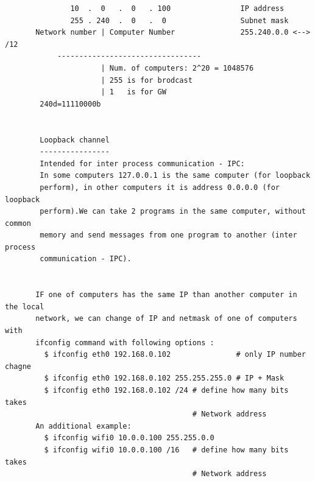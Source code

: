 \documentclass[a4paper,12pt]{article}
\begin{document}
\begin{verbatim}
               10  .  0   .  0   . 100                IP address
               255 . 240  .  0   .  0                 Subnet mask 
       Network number | Computer Number               255.240.0.0 <--> /12
            ---------------------------------        
                      | Num. of computers: 2^20 = 1048576
                      | 255 is for brodcast
                      | 1   is for GW
        240d=11110000b 


        Loopback channel
        ---------------- 
        Intended for inter process communication - IPC:      
        In some computers 127.0.0.1 is the same computer (for loopback 
        perform), in other computers it is address 0.0.0.0 (for loopback 
        perform).We can take 2 programs in the same computer, without common 
        memory and send messages from one program to another (inter process 
        communication - IPC).  


       IF one of computers has the same IP than another computer in the local 
       network, we can change of IP and netmask of one of computers with 
       ifconfig command with following options : 
         $ ifconfig eth0 192.168.0.102               # only IP number chagne
         $ ifconfig eth0 192.168.0.102 255.255.255.0 # IP + Mask
         $ ifconfig eth0 192.168.0.102 /24 # define how many bits takes 
                                           # Network address  
       An additional example: 
         $ ifconfig wifi0 10.0.0.100 255.255.0.0
         $ ifconfig wifi0 10.0.0.100 /16   # define how many bits takes
                                           # Network address     
\end{verbatim}
\end{document}
